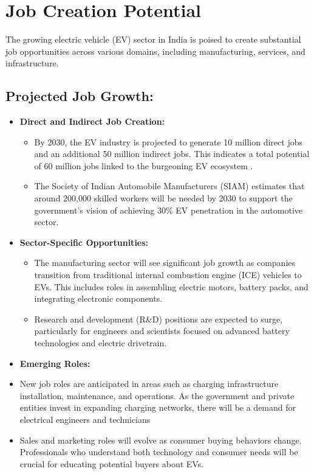 \documentclass[a4paper,12pt]{report}
\begin{document}
\section{Job Creation Potential}
The growing electric vehicle (EV) sector in India is poised to create substantial job opportunities across various domains, including manufacturing, services, and infrastructure.

\subsection{Projected Job Growth: }
\begin{itemize}
    \item \textbf{Direct and Indirect Job Creation: }
    \begin{itemize}
        \item By 2030, the EV industry is projected to generate 10 million direct jobs and an additional 50 million indirect jobs. This indicates a total potential of 60 million jobs linked to the burgeoning EV ecosystem .\cite{PeopleLogic}\cite{DownToEarth}
        \item The Society of Indian Automobile Manufacturers (SIAM) estimates that around 200,000 skilled workers will be needed by 2030 to support the government's vision of achieving 30\% EV penetration in the automotive sector.\cite{EconomicTimes}
    \end{itemize}
    \item \textbf{Sector-Specific Opportunities: }
    \begin{itemize}
        \item The manufacturing sector will see significant job growth as companies transition from traditional internal combustion engine (ICE) vehicles to EVs. This includes roles in assembling electric motors, battery packs, and integrating electronic components.
        \item Research and development (R\&D) positions are expected to surge, particularly for engineers and scientists focused on advanced battery technologies and electric drivetrain.
    \end{itemize}
    \item \textbf{Emerging Roles: }
    \item New job roles are anticipated in areas such as charging infrastructure installation, maintenance, and operations. As the government and private entities invest in expanding charging networks, there will be a demand for electrical engineers and technicians \cite{PeopleLogic}
    \item Sales and marketing roles will evolve as consumer buying behaviors change. Professionals who understand both technology and consumer needs will be crucial for educating potential buyers about EVs.
\end{itemize}
\end{document}
